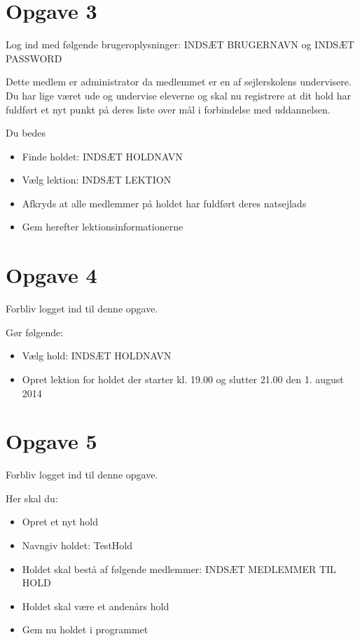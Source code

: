 \newpage
 
\section{Opgave 3}

Log ind med følgende brugeroplysninger: INDSÆT BRUGERNAVN og INDSÆT PASSWORD

Dette medlem er administrator da medlemmet er en af sejlerskolens undervisere.
Du har lige været ude og undervise eleverne og skal nu registrere at dit hold har fuldført et nyt punkt på deres liste over mål i forbindelse med uddannelsen.

Du bedes 

\begin{itemize}
\item Finde holdet: INDSÆT HOLDNAVN
\item Vælg lektion: INDSÆT LEKTION
\item Afkryds at alle medlemmer på holdet har fuldført deres natsejlads
\item Gem herefter lektionsinformationerne
\end{itemize}


\section{Opgave 4}

Forbliv logget ind til denne opgave.

Gør følgende:
\begin{itemize}
\item Vælg hold: INDSÆT HOLDNAVN
\item Opret lektion for holdet der starter kl. 19.00 og slutter 21.00 den 1. august 2014
\end{itemize}


\section{Opgave 5}

Forbliv logget ind til denne opgave.

Her skal du:
\begin{itemize}
		\item Opret et nyt hold
		\item Navngiv holdet: TestHold
		\item Holdet skal bestå af følgende medlemmer: INDSÆT MEDLEMMER TIL HOLD
		\item Holdet skal være et andenårs hold 		
		\item Gem nu holdet i programmet
\end{itemize}

